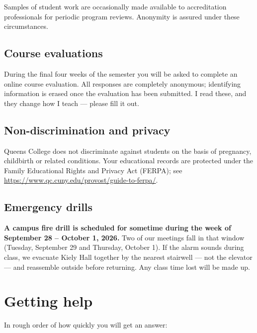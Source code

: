 \documentclass[11pt]{article}
\begin{document}
Samples of student work are occasionally made available to accreditation
professionals for periodic program reviews. Anonymity is assured under these
circumstances.

\subsection{Course evaluations}

During the final four weeks of the semester you will be asked to complete an
online course evaluation. All responses are completely anonymous; identifying
information is erased once the evaluation has been submitted. I read these, and
they change how I teach --- please fill it out.

\subsection{Non-discrimination and privacy}

Queens College does not discriminate against students on the basis of
pregnancy, childbirth or related conditions. Your educational records are
protected under the Family Educational Rights and Privacy Act (FERPA); see
\url{https://www.qc.cuny.edu/provost/guide-to-ferpa/}.

\subsection{Emergency drills}

\textbf{A campus fire drill is scheduled for sometime during the week of
September 28 -- October 1, 2026.} Two of our meetings fall in that window
(Tuesday, September 29 and Thursday, October 1). If the alarm sounds during
class, we evacuate Kiely Hall together by the nearest stairwell --- not the
elevator --- and reassemble outside before returning. Any class time lost will
be made up.

\section{Getting help}

In rough order of how quickly you will get an answer:
\end{document}
